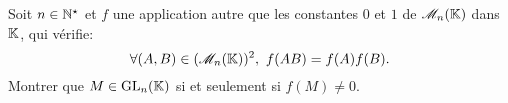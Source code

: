\begin{exercice}
    Soit $n \in \mathbb{N}^\star$ et $f$ une application autre que les constantes $0$ et $1$ de $\mathscr{M}_n(\mathbb{K})$ dans $\mathbb{K}$, qui vérifie:
    $$\forall (A, B) \in (\mathscr{M}_n(\mathbb{K}))^2,\ f(AB) = f(A)f(B).$$
    Montrer que $M \in \mathrm{GL}_n(\mathbb{K})$ si et seulement si $f(M) \not= 0$. 
\end{exercice}